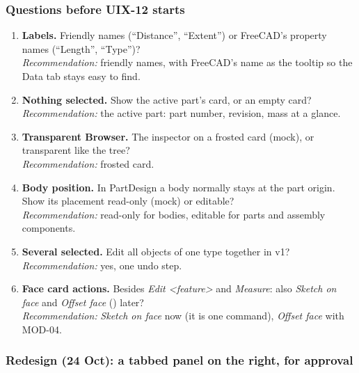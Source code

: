 \subsubsection*{Questions before UIX-12 starts}

\begin{enumerate}
  \item \textbf{Labels.} Friendly names (``Distance'', ``Extent'') or FreeCAD's property names (``Length'',
        ``Type'')?\\
        \emph{Recommendation:} friendly names, with FreeCAD's name as the tooltip so the Data tab stays easy to find.
  \item \textbf{Nothing selected.} Show the active part's card, or an empty card?\\
        \emph{Recommendation:} the active part: part number, revision, mass at a glance.
  \item \textbf{Transparent Browser.} The inspector on a frosted card (mock), or transparent like the tree?\\
        \emph{Recommendation:} frosted card.
  \item \textbf{Body position.} In PartDesign a body normally stays at the part origin. Show its placement
        read-only (mock) or editable?\\
        \emph{Recommendation:} read-only for bodies, editable for parts and assembly components.
  \item \textbf{Several selected.} Edit all objects of one type together in v1?\\
        \emph{Recommendation:} yes, one undo step.
  \item \textbf{Face card actions.} Besides \emph{Edit <feature>} and \emph{Measure}: also \emph{Sketch on face}
        and \emph{Offset face} () later?\\
        \emph{Recommendation:} \emph{Sketch on face} now (it is one command), \emph{Offset face} with MOD-04.
\end{enumerate}

\subsubsection*{Redesign (24 Oct): a tabbed panel on the right, for approval}

